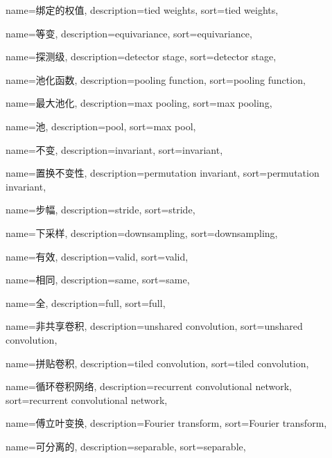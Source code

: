 {
  name=绑定的权值,
  description={tied weights},
  sort={tied weights},
}

{
  name=等变,
  description={equivariance},
  sort={equivariance},
}

{
  name=探测级,
  description={detector stage},
  sort={detector stage},
}

{
  name=池化函数,
  description={pooling function},
  sort={pooling function},
}

{
  name=最大池化,
  description={max pooling},
  sort={max pooling},
}

{
  name=池,
  description={pool},
  sort={max pool},
}

{
  name=不变,
  description={invariant},
  sort={invariant},
}

{
  name=置换不变性,
  description={permutation invariant},
  sort={permutation invariant},
}

{
  name=步幅,
  description={stride},
  sort={stride},
}

{
  name=下采样,
  description={downsampling},
  sort={downsampling},
}

{
  name=有效,
  description={valid},
  sort={valid},
}

{
  name=相同,
  description={same},
  sort={same},
}

{
  name=全,
  description={full},
  sort={full},
}

{
  name=非共享卷积,
  description={unshared convolution},
  sort={unshared convolution},
}

{
  name=拼贴卷积,
  description={tiled convolution},
  sort={tiled convolution},
}

{
  name=循环卷积网络,
  description={recurrent convolutional network},
  sort={recurrent convolutional network},
}

{
  name=傅立叶变换,
  description={Fourier transform},
  sort={Fourier transform},
}

{
  name=可分离的,
  description={separable},
  sort={separable},
}

